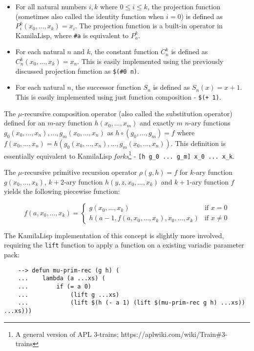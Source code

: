 \begin{itemize}
    \item For all natural numbers $i, k$ where $0 \le i \le k$, the projection function (sometimes also called the identity function when $i=0$) is defined as $P_i^k(x_0, \dots, x_k)=x_i$. The projection function is a built-in operator in KamilaLisp, where \verb|#a| is equivalent to $P_a^k$.
    \item For each natural $n$ and $k$, the constant function $C_n^k$ is defined as $C_n^k(x_0, \dots, x_k) = x_n$. This is easily implemented using the previously discussed projection function as \verb|$(#0 n)|.
    \item For each natural $n$, the successor function $S_n$ is defined as $S_n(x) = x + 1$. This is easily implemented using just function composition - \verb|$(+ 1)|.
\end{itemize}

The $\mu$-recursive composition operator (also called the substitution operator) defined for an $m$-ary function $h(x_0, \dots, x_m)$ and exactly $m$ $n$-ary functions $g_0(x_0, \dots, x_n), \dots, g_m(x_0, \dots, x_n)$ as $h\circ(g_0, \dots, g_m) = f$ where $f(x_0, \dots, x_n) = h(g_0(x_0, \dots, x_n), \dots, g_m(x_0, \dots, x_n))$. This definition is essentially equivalent to KamilaLisp \textit{forks}\footnote{A general version of APL 3-trains; https://aplwiki.com/wiki/Train\#3-trains} - \verb|[h g_0 ... g_m] x_0 ... x_k|.

The $\mu$-recursive primitive recursion operator $\rho(g,h)=f$ for $k$-ary function $g(x_0,\dots,x_k)$, $k+2$-ary function $h(y,z,x_0,\dots,x_k)$ and $k+1$-ary function $f$ yields the following piecewise function:

\begin{equation*}
f(a,x_0,\dots,x_k)=
    \begin{cases}
        g(x_0,\dots,x_k) & \text{if } x = 0\\
        h(a-1,f(a,x_0,\dots,x_k),x_0,\dots,x_k) & \text{if } x \ne 0
    \end{cases}
\end{equation*}

The KamilaLisp implementation of this concept is slightly more involved, requiring the \verb|lift| function to apply a function on a existing variadic parameter pack:

\begin{Verbatim}
    --> defun mu-prim-rec (g h) (
    ...    lambda (a ...xs) (
    ...        if (= a 0)
    ...            (lift g ...xs)
    ...            (lift $(h (- a 1) (lift $(mu-prim-rec g h) ...xs)) ...xs)))
\end{Verbatim}

